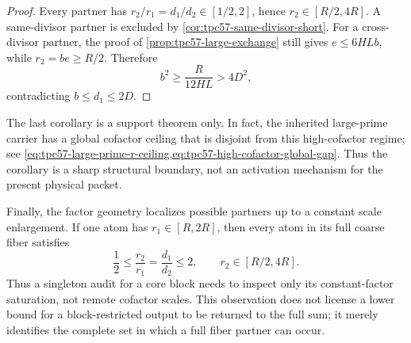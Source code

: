\begin{proof}
Every partner has
\(r_2/r_1=d_1/d_2\in[1/2,2]\), hence
\(r_2\in[R/2,4R]\).  A same-divisor partner is excluded by
\cref{cor:tpc57-same-divisor-short}.  For a cross-divisor partner, the
proof of \cref{prop:tpc57-large-exchange} still gives
\(e\le6HLb\), while \(r_2=be\ge R/2\).  Therefore
\[
 b^2\ge\frac{R}{12HL}>4D^2,
\]
contradicting \(b\le d_1\le2D\).
\end{proof}

The last corollary is a support theorem only.  In fact, the inherited
large-prime carrier has a global cofactor ceiling that is disjoint from
this high-cofactor regime; see
\cref{eq:tpc57-large-prime-r-ceiling,eq:tpc57-high-cofactor-global-gap}.
Thus the corollary is a sharp structural boundary, not an activation
mechanism for the present physical packet.

Finally, the factor geometry localizes possible partners up to a constant
scale enlargement.  If one atom has \(r_1\in[R,2R]\), then every atom in
its full coarse fiber satisfies
\begin{equation}
 \frac12\le\frac{r_2}{r_1}=\frac{d_1}{d_2}\le2,
 \qquad
 r_2\in[R/2,4R].
 \label{eq:tpc57-cofactor-saturation}
\end{equation}
Thus a singleton audit for a core block needs to inspect only its
constant-factor saturation, not remote cofactor scales.  This observation
does not license a lower bound for a block-restricted output to be returned
to the full sum; it merely identifies the complete set in which a full
fiber partner can occur.
